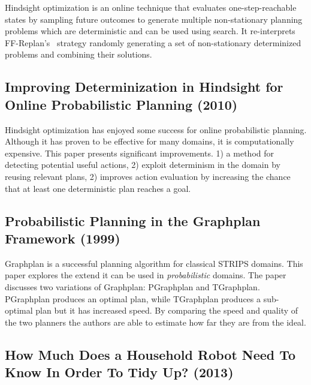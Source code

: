 \documentclass[runningheads,a4paper]{llncs}
\begin{document}
Hindsight optimization is an online technique that evaluates one-step-reachable
states by sampling future outcomes to generate multiple non-stationary planning
problems which are deterministic and can be used using search. It re-interprets
FF-Replan's~\cite{FFReplan} strategy randomly generating a set of non-stationary
determinized problems and combining their solutions.

\subsection{Improving Determinization in Hindsight for Online Probabilistic Planning (2010)~\cite{yoon2010improving}}
Hindsight optimization has enjoyed some success for online probabilistic
planning. Although it has proven to be effective for many domains, it is
computationally expensive. This paper presents significant improvements.  1) a
method for detecting potential useful actions, 2) exploit determinism in the
domain by reusing relevant plans, 2) improves action evaluation by increasing
the chance that at least one deterministic plan reaches a goal.

\subsection{Probabilistic Planning in the Graphplan Framework (1999)~\cite{Blum99probabilisticplanning}}
Graphplan is a successful planning algorithm for classical STRIPS domains. This
paper explores the extend it can be used in \emph{probabilistic} domains. The
paper discusses two variations of Graphplan: PGraphplan and TGraphplan.
PGraphplan produces an optimal plan, while TGraphplan produces a sub-optimal
plan but it has increased speed. By comparing the speed and quality of the
two planners the authors are able to estimate how far they are from the ideal.


\subsection{How Much Does a Household Robot Need To Know In Order To Tidy Up? (2013)~\cite{nebel2013much}}
\end{document}
